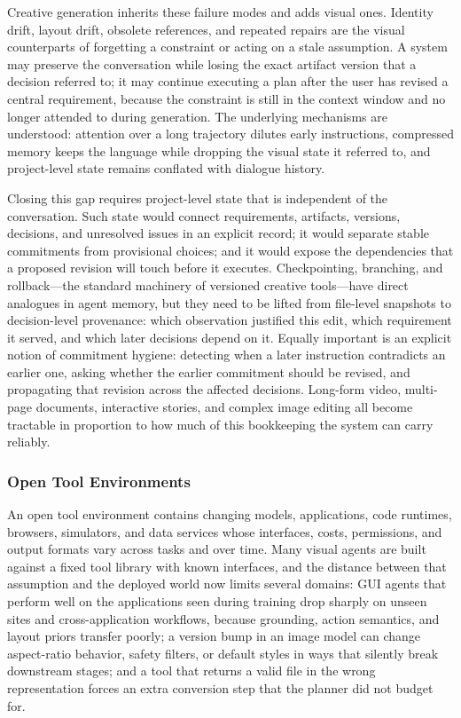 Creative generation inherits these failure modes and adds visual ones. Identity drift, layout drift, obsolete references, and repeated repairs are the visual counterparts of forgetting a constraint or acting on a stale assumption. A system may preserve the conversation while losing the exact artifact version that a decision referred to; it may continue executing a plan after the user has revised a central requirement, because the constraint is still in the context window and no longer attended to during generation. The underlying mechanisms are understood: attention over a long trajectory dilutes early instructions, compressed memory keeps the language while dropping the visual state it referred to, and project-level state remains conflated with dialogue history.

Closing this gap requires project-level state that is independent of the conversation. Such state would connect requirements, artifacts, versions, decisions, and unresolved issues in an explicit record; it would separate stable commitments from provisional choices; and it would expose the dependencies that a proposed revision will touch before it executes. Checkpointing, branching, and rollback---the standard machinery of versioned creative tools---have direct analogues in agent memory, but they need to be lifted from file-level snapshots to decision-level provenance: which observation justified this edit, which requirement it served, and which later decisions depend on it. Equally important is an explicit notion of commitment hygiene: detecting when a later instruction contradicts an earlier one, asking whether the earlier commitment should be revised, and propagating that revision across the affected decisions. Long-form video, multi-page documents, interactive stories, and complex image editing all become tractable in proportion to how much of this bookkeeping the system can carry reliably.

\subsubsection{Open Tool Environments}

An open tool environment contains changing models, applications, code runtimes, browsers, simulators, and data services whose interfaces, costs, permissions, and output formats vary across tasks and over time. Many visual agents are built against a fixed tool library with known interfaces, and the distance between that assumption and the deployed world now limits several domains: GUI agents that perform well on the applications seen during training drop sharply on unseen sites and cross-application workflows, because grounding, action semantics, and layout priors transfer poorly; a version bump in an image model can change aspect-ratio behavior, safety filters, or default styles in ways that silently break downstream stages; and a tool that returns a valid file in the wrong representation forces an extra conversion step that the planner did not budget for.

